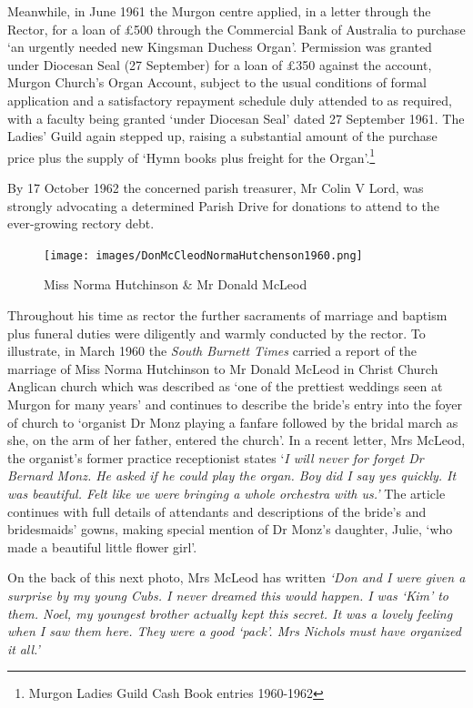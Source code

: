 Meanwhile, in June 1961 the Murgon centre applied, in a letter through
the Rector, for a loan of \pounds500 through the Commercial Bank of Australia
to purchase `an urgently needed new Kingsman Duchess Organ'. Permission
was granted under Diocesan Seal (27 September) for a loan of \pounds350
against the account, Murgon Church's Organ Account, subject to the usual
conditions of formal application and a satisfactory repayment schedule
duly attended to as required, with a faculty being granted `under
Diocesan Seal' dated 27 September 1961. The Ladies' Guild again stepped
up, raising a substantial amount of the purchase price plus the supply
of `Hymn books plus freight for the Organ'.\footnote{Murgon Ladies Guild
  Cash Book entries 1960-1962}

By 17 October 1962 the concerned parish treasurer, Mr Colin V Lord, was
strongly advocating a determined Parish Drive for donations to attend to
the ever-growing rectory debt.




\begin{figure}[!t]
\begin{center}
\texttt{[image: images/DonMcCleodNormaHutchenson1960.png]}
\caption{Miss Norma Hutchinson \& Mr Donald McLeod}
\end{center}
\end{figure}


Throughout his time as rector the further sacraments of marriage and
baptism plus funeral duties were diligently and warmly conducted by the
rector. To illustrate, in March 1960 the \emph{South Burnett Times}
carried a report of the marriage of Miss Norma Hutchinson to Mr Donald
McLeod in Christ Church Anglican church which was described as `one of
the prettiest weddings seen at Murgon for many years' and continues to
describe the bride's entry into the foyer of church to `organist Dr Monz
playing a fanfare followed by the bridal march as she, on the arm of her
father, entered the church'. In a recent letter, Mrs McLeod, the
organist's former practice receptionist states `\emph{I will never for
forget Dr Bernard Monz. He asked if he could play the organ. Boy did I
say yes quickly. It was beautiful. Felt like we were bringing a whole
orchestra with us.'} The article continues with full details of
attendants and descriptions of the bride's and bridesmaids' gowns,
making special mention of Dr Monz's daughter, Julie, `who made a
beautiful little flower girl'.

On the back of this next photo, Mrs McLeod has written \emph{`Don and I
were given a surprise by my young Cubs. I never dreamed this would
happen. I was `Kim' to them. Noel, my youngest brother actually kept
this secret. It was a lovely feeling when I saw them here. They were a
good `pack'. Mrs Nichols must have organized it} \emph{all.'}

